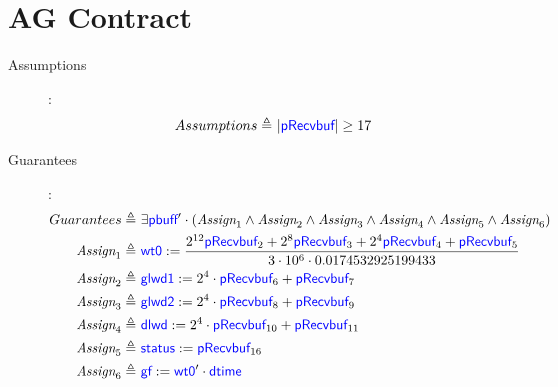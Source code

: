\documentclass[fleqn,a4paper]{article}
\newcommand\Var[1]{\textcolor{blue}{\textsf{#1}}}
\newcommand\definedby{\triangleq}
\begin{document}
\section{AG Contract}

\begin{description}

\item[Assumptions]:
\begin{align*}
Assumptions \definedby \
& |\Var{pRecvbuf}| \geq 17
\end{align*}

\item[Guarantees]:
\begin{align*}
Guarantees \definedby \
& \exists\Var{pbuff}' \cdot (\textit{Assign}_1 \wedge \textit{Assign}_2 \wedge \textit{Assign}_3 \wedge \textit{Assign}_4 \wedge \textit{Assign}_5 \wedge \textit{Assign}_6) \\
\textit{Assign}_1 \definedby \
& \Var{wt0} := \dfrac{2^{12} \Var{pRecvbuf}_2 + 2^8 \Var{pRecvbuf}_3 + 2^4 \Var{pRecvbuf}_4 + \Var{pRecvbuf}_5}{3\cdot 10^6 \cdot0.0174532925199433} \\
\textit{Assign}_2 \definedby \
& \Var{glwd1} := 2^4 \cdot \Var{pRecvbuf}_6 + \Var{pRecvbuf}_7 \\
\textit{Assign}_3 \definedby \
& \Var{glwd2} := 2^4 \cdot \Var{pRecvbuf}_8 + \Var{pRecvbuf}_9 \\
\textit{Assign}_4 \definedby \
& \Var{dlwd} := 2^4 \cdot \Var{pRecvbuf}_{10} + \Var{pRecvbuf}_{11} \\
\textit{Assign}_5 \definedby \
& \Var{status} := \Var{pRecvbuf}_{16} \\
\textit{Assign}_6 \definedby \
& \Var{gf} := \Var{wt0}' \cdot \Var{dtime}
\end{align*}

\end{description}
\end{document}
